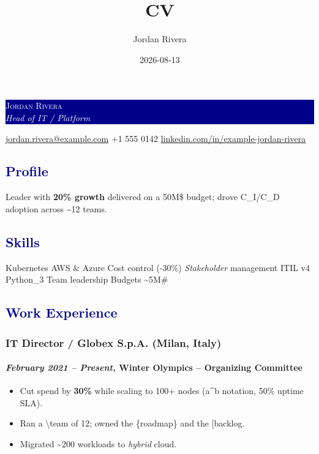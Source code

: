 \documentclass[a4paper]{article}
\title{CV}
\author{Jordan Rivera}
\date{2026-08-13}
\newcommand\textstyleStrongEmphasis[1]{\textbf{#1}}
\newcommand\textstyleEmphasis[1]{\textit{#1}}
\newcommand\liststyleListi{%
\renewcommand\labelitemi{{\textbullet}}
\renewcommand\labelitemii{{\textbullet}}
\renewcommand\labelitemiii{{\textbullet}}
\renewcommand\labelitemiv{{\textbullet}}
}
\begin{document}
\noindent
\colorbox{darkblue}{\parbox{\dimexpr\linewidth-2\fboxsep}{%
  \textcolor{white}{\Large\scshape Jordan Rivera}\\[2pt]
  \textcolor{white}{\large\itshape Head of IT / Platform}}}



\begin{center}
  \textcolor{darkblue}{\faEnvelope}\hspace{0.35em}\href{mailto:jordan.rivera@example.com}{jordan.rivera@example.com}\quad
  \textcolor{darkblue}{\faPhone}\hspace{0.35em}+1 555 0142\quad
  \textcolor{darkblue}{\faLinkedin}\hspace{0.35em}\href{https://www.linkedin.com/in/example-jordan-rivera}{linkedin.com/in/example-jordan-rivera}
\end{center}
\textcolor{darkblue}{\subsection{Profile}}
{Leader with \textbf{20\% growth} delivered on a 50M\$ budget; drove C\_I/C\_D adoption across \textasciitilde{}12 teams.}

\textcolor{darkblue}{\subsection{Skills}}
\noindent
{Kubernetes {\textbullet} AWS \& Azure {\textbullet} Cost control (-30\%) {\textbullet} \textit{Stakeholder} management {\textbullet} ITIL v4 {\textbullet} Python\_3 {\textbullet} Team leadership {\textbullet} Budgets \textasciitilde{}5M\#}

\textcolor{darkblue}{\subsection{Work Experience}}
\subsubsection[IT Director / Globex S.p.A. (Milan, Italy)]{\textstyleStrongEmphasis{IT Director / Globex S.p.A.} \textmd{(Milan, Italy)}}
\paragraph[February 2021 {}-- Present, Winter Olympics {}-- Organizing Committee]{\textstyleEmphasis{February 2021 {}-- Present, }\textstyleStrongEmphasis{Winter Olympics {}-- Organizing Committee}}
\liststyleListi
\begin{itemize}
\item {Cut spend by \textbf{30\%} while scaling to 100+ nodes (a\textasciicircum{}b notation, 50\% uptime SLA).}
\item {Ran a \textbackslash{}team of 12; owned the \{roadmap\} and the [backlog\].}
\item {Migrated \textasciitilde{}200 workloads to \textit{hybrid} cloud.}
\end{itemize}
\end{document}
